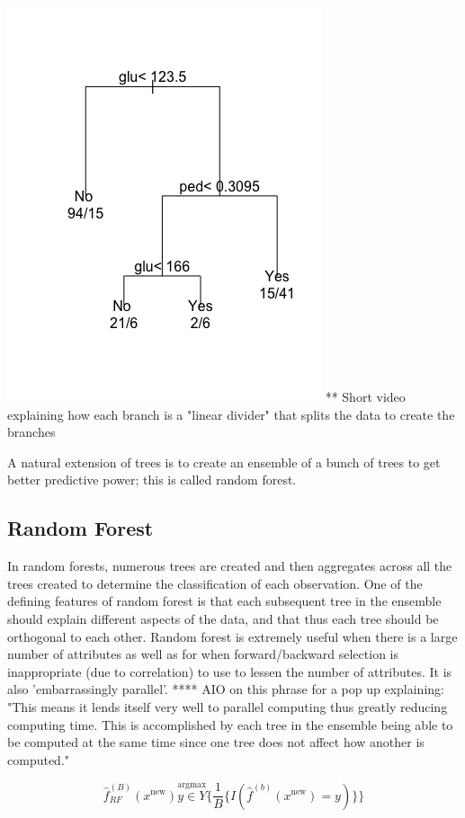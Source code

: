 \documentclass[a4paper]{article}
\begin{document}
\includegraphics[scale=.6]{tree_diag.png}
** Short video explaining how each branch is a "linear divider" that splits the data to create the branches

A natural extension of trees is to create an ensemble of a bunch of trees to get better predictive power; this is called random forest.

\subsection{Random Forest}

In random forests, numerous trees are created and then aggregates across all the trees created to determine the classification of each observation. One of the defining features of random forest is that each subsequent tree in the ensemble should explain different aspects of the data, and that thus each tree should be orthogonal to each other. Random forest is extremely useful when there is a large number of attributes as well as for when forward/backward selection is inappropriate (due to correlation) to use to lessen the number of attributes. It is also 'embarrassingly parallel'. **** AIO on this phrase for a pop up explaining: "This means it lends itself very well to parallel computing thus greatly reducing computing time. This is accomplished by each tree in the ensemble being able to be computed at the same time since one tree does not affect how another is computed."

$$\hat{f}_{RF}^{(B)}(x^{\text{new}})\stackrel{\text{argmax}}{y\in Y}\Big\{\frac{1}{B}\{I(\hat{f}^{(b)}(x^{\text{new}})=y)\}\Big\}$$
\end{document}
